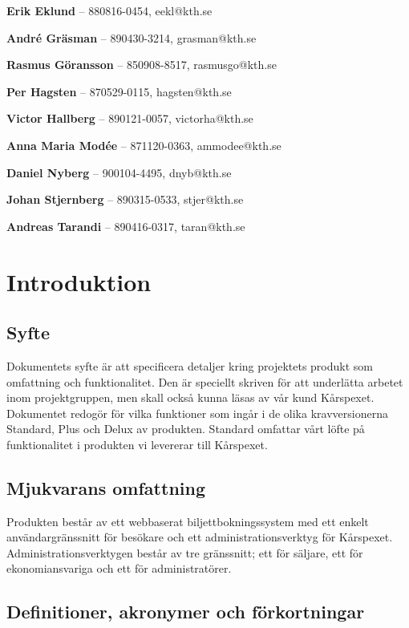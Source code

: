\documentclass[a4paper, twoside, 11pt, titlepage]{article}
\begin{document}
\textbf{Erik Eklund} -- 880816-0454, eekl@kth.se

\textbf{André Gräsman} -- 890430-3214, grasman@kth.se

\textbf{Rasmus Göransson} -- 850908-8517, rasmusgo@kth.se

\textbf{Per Hagsten} -- 870529-0115, hagsten@kth.se

\textbf{Victor Hallberg} -- 890121-0057, victorha@kth.se

\textbf{Anna Maria Modée} -- 871120-0363, ammodee@kth.se

\textbf{Daniel Nyberg} -- 900104-4495, dnyb@kth.se

\textbf{Johan Stjernberg} -- 890315-0533, stjer@kth.se

\textbf{Andreas Tarandi} -- 890416-0317, taran@kth.se

\clearpage \tableofcontents \clearpage

\clearpage
\section{Introduktion}



	\subsection{Syfte}


	Dokumentets syfte är att specificera detaljer kring projektets produkt som omfattning och funktionalitet. Den är speciellt skriven för att underlätta arbetet inom projektgruppen, men skall också kunna läsas av vår kund Kårspexet. Dokumentet redogör för vilka funktioner som ingår i de olika kravversionerna Standard, Plus och Delux av produkten. Standard omfattar vårt löfte på funktionalitet i produkten vi levererar till Kårspexet.

	\subsection{Mjukvarans omfattning}


	Produkten består av ett webbaserat biljettbokningssystem med ett enkelt användargränssnitt för besökare och ett administrationsverktyg för Kårspexet. Administrationsverktygen består av tre gränssnitt; ett för säljare, ett för ekonomiansvariga och ett för administratörer.

	\subsection{Definitioner, akronymer och förkortningar}
\end{document}
